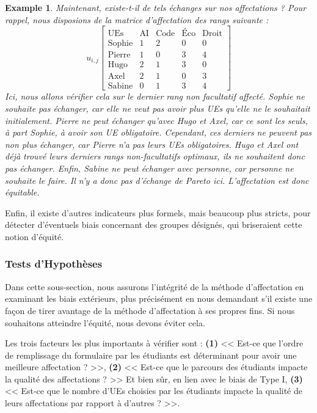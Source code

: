 \documentclass{rapport}
\theoremstyle{definition}
\theoremstyle{remark}
\theoremstyle{plain}
\newtheorem{example}{Example}
\theoremstyle{definition}
\theoremstyle{definition}
\theoremstyle{remark}
\theoremstyle{definition}
\begin{document}
\begin{example}\label{ex:running6}
    Maintenant, existe-t-il de tels échanges sur nos affectations ? Pour rappel, nous disposions de la matrice d'affectation des rangs suivante :
    $$
        u_{i,j}\begin{bmatrix}
            \text{UEs} & \text{AI} & \text{Code} & \text{Éco} & \text{Droit}\\
            \text{Sophie} & 1 & 2 & 0 & 0\\
            \text{Pierre} & 1 & 0 & 3 & 4\\
            \text{Hugo} & 2 & 1 & 3 & 0\\
            \text{Axel} & 2 & 1 & 0 & 3\\
            \text{Sabine} & 0 & 1 & 3 & 4
        \end{bmatrix}
    $$
    Ici, nous allons vérifier cela sur le dernier rang non facultatif affecté. Sophie ne souhaite pas échanger, car elle ne veut pas avoir plus UEs qu'elle ne le souhaitait initialement. Pierre ne peut échanger qu'avec Hugo et Axel, car ce sont les seuls, à part Sophie, à avoir son UE obligatoire. Cependant, ces derniers ne peuvent pas non plus échanger, car Pierre n'a pas leurs UEs obligatoires.
    Hugo et Axel ont déjà trouvé leurs derniers rangs non-facultatifs optimaux, ils ne souhaitent donc pas échanger. Enfin, Sabine ne peut échanger avec personne, car personne ne souhaite le faire.
    Il n'y a donc pas d'échange de Pareto ici. L'affectation est donc équitable.
\end{example}

Enfin, il existe d'autres indicateurs plus formels, mais beaucoup plus stricts, pour détecter d'éventuels biais concernant des groupes désignés, qui briseraient cette notion d'équité.

\subsubsection{Tests d'Hypothèses}
Dans cette sous-section, nous assurons l'intégrité de la méthode d'affectation en examinant les biais extérieurs, plus précisément en nous demandant s'il existe une façon de tirer avantage de la méthode d'affectation à ses propres fins.
Si nous souhaitons atteindre l'équité, nous devons éviter cela.

Les trois facteurs les plus importants à vérifier sont : \textbf{(1)} << Est-ce que l'ordre de remplissage du formulaire par les étudiants est déterminant pour avoir une meilleure affectation ? >>,
\textbf{(2)} << Est-ce que le parcours des étudiants impacte la qualité des affectations ? >> Et bien sûr, en lien avec le biais de Type I,
\textbf{(3)} << Est-ce que le nombre d'UEs choisies par les étudiants impacte la qualité de leurs affectations par rapport à d'autres ? >>.
\end{document}
